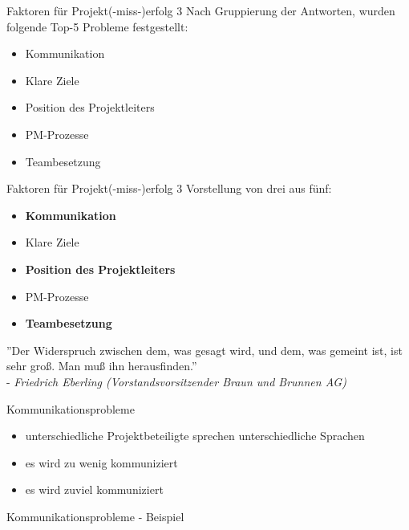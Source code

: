 \documentclass[12pt]{beamer}
\begin{document}
	\begin{frame}{Faktoren für Projekt(-miss-)erfolg 3}
		Nach Gruppierung der Antworten, wurden folgende Top-5 Probleme festgestellt:
		\begin{itemize}
			\item{Kommunikation}
			\item{Klare Ziele}
			\item{Position des Projektleiters}
			\item{PM-Prozesse}
			\item{Teambesetzung}
		\end{itemize}

	\end{frame}
	
	\begin{frame}{Faktoren für Projekt(-miss-)erfolg 3}
		Vorstellung von drei aus fünf: 
		\begin{itemize}
			\item{\textbf{Kommunikation}}
			\item{Klare Ziele}
			\item{\textbf{Position des Projektleiters}}
			\item{PM-Prozesse}
			\item{\textbf{Teambesetzung}}
		\end{itemize}
	\end{frame}

	\thispagestyle{empty}
	\begin{frame}
		''Der Widerspruch zwischen dem, was gesagt wird, und dem, was gemeint ist, ist sehr groß. Man muß ihn herausfinden.'' \\ 
		- \textit{Friedrich Eberling (Vorstandsvorsitzender Braun und Brunnen AG)}
	\end{frame}

	\begin{frame}{Kommunikationsprobleme}
		\begin{itemize}
			\item{unterschiedliche Projektbeteiligte sprechen unterschiedliche Sprachen}
			\item{es wird zu wenig kommuniziert}
			\item{es wird zuviel kommuniziert}
		\end{itemize}
	\end{frame}
	
	\begin{frame}{Kommunikationsprobleme - Beispiel}
		
	\end{frame}
	
\end{document}
